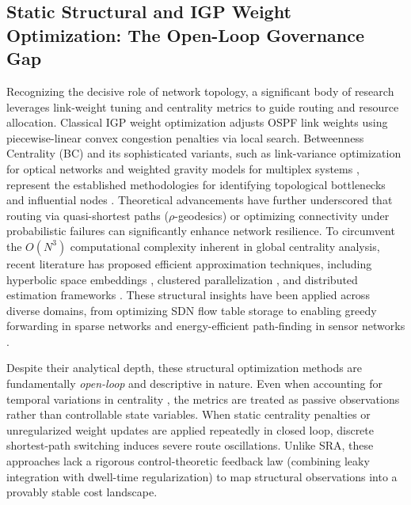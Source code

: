 \documentclass[journal]{IEEEtran}
\theoremstyle{plain}
\theoremstyle{definition}
\newcommand{\rev}[1]{{\color{blue}#1}}
\begin{document}
\subsection{Static Structural \rev{and IGP Weight} Optimization: The Open-Loop Governance Gap}

Recognizing the decisive role of network topology, a significant body of research leverages \rev{link-weight tuning \cite{Fortz2000OSPF} and} centrality metrics to guide routing and resource allocation. \rev{Classical IGP weight optimization \cite{Fortz2000OSPF} adjusts OSPF link weights using piecewise-linear convex congestion penalties via local search.} Betweenness Centrality (BC) \cite{Brandes2001Faster} and its sophisticated variants, such as link-variance optimization for optical networks \cite{Upadhyay2024OpticalBC} and weighted gravity models for multiplex systems \cite{Ni2023Gravity}, represent the established methodologies for identifying topological bottlenecks and influential nodes \cite{Basaras2019Influential, Wehmuth2021SpuriousPaths}. Theoretical advancements have further underscored that routing via quasi-shortest paths ($\rho$-geodesics) \cite{DeMedeiros2017QuasiShortest} or optimizing connectivity under probabilistic failures \cite{Cavallaro2022Connectivity} can significantly enhance network resilience. To circumvent the $O(N^3)$ computational complexity inherent in global centrality analysis, recent literature has proposed efficient approximation techniques, including hyperbolic space embeddings \cite{Stai2017Hyperbolic}, clustered parallelization \cite{Suppa2015FastBC}, and distributed estimation frameworks \cite{Maccari2020DistributedLoad, Maccari2018DistributedDV}. These structural insights have been applied across diverse domains, from optimizing SDN flow table storage \cite{Ma2019FlowTable} to enabling greedy forwarding in sparse networks \cite{Ahmed2025SparseNet} and energy-efficient path-finding in sensor networks \cite{Oliveira2010WSNcentrality}.

Despite their analytical depth, these structural optimization methods are fundamentally \textit{open-loop} and descriptive in nature. Even when accounting for temporal variations in centrality \cite{Ghanem2019DynamicCentrality}, the metrics are treated as passive observations rather than controllable state variables. \rev{When static centrality penalties or unregularized weight updates are applied repeatedly in closed loop, discrete shortest-path switching induces severe route oscillations.} Unlike SRA, these approaches lack a rigorous control-theoretic feedback law \rev{(combining leaky integration with dwell-time regularization)} to map structural observations into a provably stable cost landscape.
\end{document}
